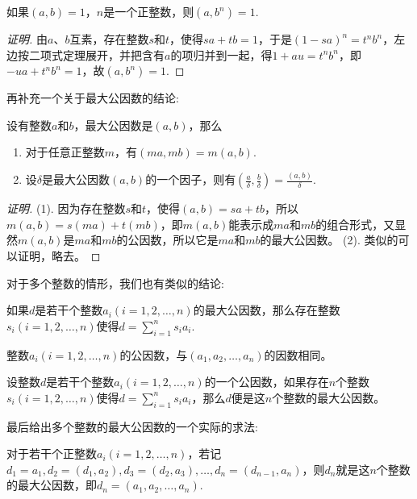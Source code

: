 \begin{theorem}
  如果$(a,b)=1$，$n$是一个正整数，则$(a,b^n)=1$.
\end{theorem}

\begin{proof}[证明]
  由$a$、$b$互素，存在整数$s$和$t$，使得$sa+tb=1$，于是$(1-sa)^n=t^nb^n$，左边按二项式定理展开，并把含有$a$的项归并到一起，得$1+au=t^nb^n$，即$-ua+t^nb^n=1$，故$(a,b^n)=1$.
\end{proof}

再补充一个关于最大公因数的结论:
\begin{theorem}
  设有整数$a$和$b$，最大公因数是$(a,b)$，那么
  \begin{enumerate}
  \item 对于任意正整数$m$，有$(ma, mb)=m(a,b)$.
  \item 设$\delta$是最大公因数$(a,b)$的一个因子，则有$(\frac{a}{\delta}, \frac{b}{\delta})=\frac{(a,b)}{\delta}$.
  \end{enumerate}
\end{theorem}

\begin{proof}[证明]
  (1). 因为存在整数$s$和$t$，使得$(a,b)=sa+tb$，所以$m(a,b)=s(ma)+t(mb)$，即$m(a,b)$能表示成$ma$和$mb$的组合形式，又显然$m(a,b)$是$ma$和$mb$的公因数，所以它是$ma$和$mb$的最大公因数。
  (2). 类似的可以证明，略去。
\end{proof}

对于多个整数的情形，我们也有类似的结论:
\begin{theorem}
  如果$d$是若干个整数$a_i(i=1,2,\ldots,n)$的最大公因数，那么存在整数$s_i(i=1,2,\ldots,n)$使得$d=\sum_{i=1}^n s_ia_i$.
\end{theorem}

\begin{inference}
  整数$a_i(i=1,2,\ldots,n)$的公因数，与$(a_1,a_2,\ldots,a_n)$的因数相同。
\end{inference}

\begin{theorem}
  设整数$d$是若干个整数$a_i(i=1,2,\ldots,n)$的一个公因数，如果存在$n$个整数$s_i(i=1,2,\ldots,n)$使得$d=\sum_{i=1}^n s_ia_i$，那么$d$便是这$n$个整数的最大公因数。
\end{theorem}

最后给出多个整数的最大公因数的一个实际的求法:
\begin{theorem}
  对于若干个正整数$a_i(i=1,2,\ldots,n)$，若记$d_1=a_1, d_2=(d_1,a_2), d_3=(d_2, a_3),\ldots,d_n=(d_{n-1},a_n)$，则$d_n$就是这$n$个整数的最大公因数，即$d_n=(a_1,a_2,\ldots,a_n)$.
\end{theorem}

